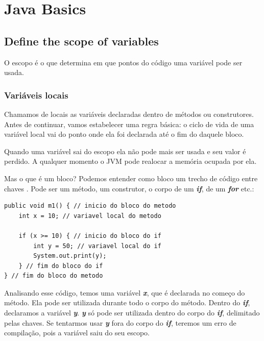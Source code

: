 \documentclass[12pt]{article}
\begin{document}
\newpage

\setcounter{page}{1} %
\tableofcontents %
\pagestyle{fancy}
\fancyfoot[C]{\thepage} %
\newpage

\listoffigures %
\newpage

\setcounter{page}{1} %
\pagestyle{fancy}
\fancyfoot[C]{\thepage}


\section{Java Basics}
\subsection{Define the scope of variables}

O escopo é o que determina em que pontos do código uma variável pode ser usada.

\subsubsection{Variáveis locais}

Chamamos de locais as variáveis declaradas dentro de métodos ou construtores. Antes de continuar, vamos estabelecer uma regra básica: o ciclo de vida de uma variável local vai do ponto onde ela foi declarada até o fim do daquele bloco.

Quando uma variável sai do escopo ela não pode mais ser usada e seu valor é perdido. A qualquer momento o JVM pode realocar a memória ocupada por ela.

Mas o que é um bloco? Podemos entender como bloco um trecho de código entre chaves \textbf{\textit{{}}}. Pode ser um método, um construtor, o corpo de um \textbf{\textit{if}}, de um \textbf{\textit{for}} etc.:

\begin{lstlisting}
public void m1() { // inicio do bloco do metodo
	int x = 10; // variavel local do metodo
	
	if (x >= 10) { // inicio do bloco do if
		int y = 50; // variavel local do if
		System.out.print(y);
	} // fim do bloco do if
} // fim do bloco do metodo
\end{lstlisting}

Analisando esse código, temos uma variável \textbf{\textit{x}}, que é declarada no começo do método. Ela pode ser utilizada durante todo o corpo do método. Dentro do \textbf{\textit{if}}, declaramos a variável \textbf{\textit{y}}. \textbf{\textit{y}} só pode ser utilizada dentro do corpo do \textbf{\textit{if}}, delimitado pelas chaves. Se tentarmos usar \textbf{\textit{y}} fora do corpo do \textbf{\textit{if}}, teremos um erro de compilação, pois a variável saiu do seu escopo.
\end{document}
